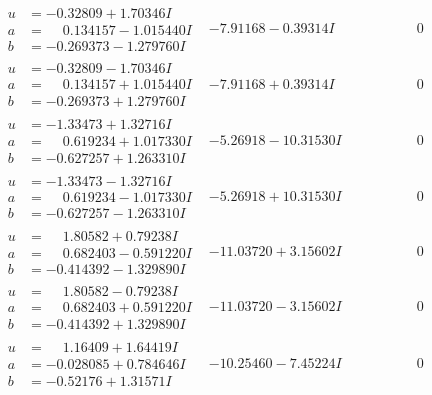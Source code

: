 \documentclass[1p]{elsarticle_modified}
\theoremstyle{definition}
\begin{document}
$$\begin{array}{c|c|c}
\begin{aligned}
u &= -0.32809 + 1.70346 I \\
a &= \phantom{-}0.134157 - 1.015440 I \\
b &= -0.269373 - 1.279760 I\end{aligned}
 & -7.91168 - 0.39314 I & \phantom{-0.000000 } 0 \\ \hline\begin{aligned}
u &= -0.32809 - 1.70346 I \\
a &= \phantom{-}0.134157 + 1.015440 I \\
b &= -0.269373 + 1.279760 I\end{aligned}
 & -7.91168 + 0.39314 I & \phantom{-0.000000 } 0 \\ \hline\begin{aligned}
u &= -1.33473 + 1.32716 I \\
a &= \phantom{-}0.619234 + 1.017330 I \\
b &= -0.627257 + 1.263310 I\end{aligned}
 & -5.26918 - 10.31530 I & \phantom{-0.000000 } 0 \\ \hline\begin{aligned}
u &= -1.33473 - 1.32716 I \\
a &= \phantom{-}0.619234 - 1.017330 I \\
b &= -0.627257 - 1.263310 I\end{aligned}
 & -5.26918 + 10.31530 I & \phantom{-0.000000 } 0 \\ \hline\begin{aligned}
u &= \phantom{-}1.80582 + 0.79238 I \\
a &= \phantom{-}0.682403 - 0.591220 I \\
b &= -0.414392 - 1.329890 I\end{aligned}
 & -11.03720 + 3.15602 I & \phantom{-0.000000 } 0 \\ \hline\begin{aligned}
u &= \phantom{-}1.80582 - 0.79238 I \\
a &= \phantom{-}0.682403 + 0.591220 I \\
b &= -0.414392 + 1.329890 I\end{aligned}
 & -11.03720 - 3.15602 I & \phantom{-0.000000 } 0 \\ \hline\begin{aligned}
u &= \phantom{-}1.16409 + 1.64419 I \\
a &= -0.028085 + 0.784646 I \\
b &= -0.52176 + 1.31571 I\end{aligned}
 & -10.25460 - 7.45224 I & \phantom{-0.000000 } 0\\

\end{array}$$
\end{document}

